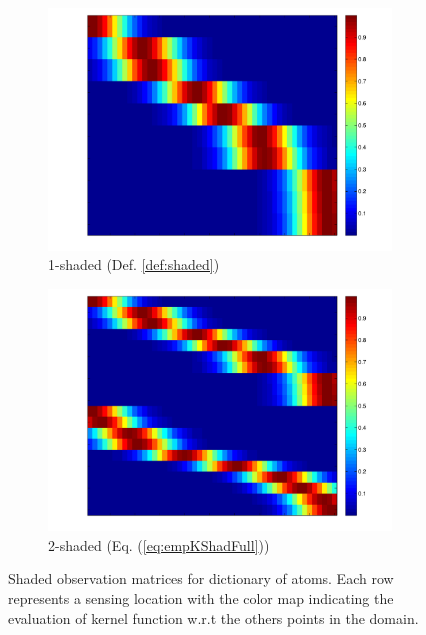 \documentclass[letterpaper,12pt,peerreviewca,draftcls]{IEEEtran}
\renewcommand{\eqref}[1]{(\ref{eq:#1})}
\begin{document}
\begin{figure}
	\centering
	\begin{subfigure}[t]{0.49\textwidth}
		\includegraphics[width=\linewidth]{"Figure 4a.pdf"}
		\caption{1-shaded (Def. \ref{def:shaded})} \label{fig:shadeda}
	\end{subfigure}
	\begin{subfigure}[t]{0.49\textwidth}
		\includegraphics[width=\linewidth]{"Figure 4b.pdf"} 
		\caption{2-shaded (Eq. \eqref{empKShadFull})} \label{fig:shadedb}
	\end{subfigure}
	\caption{Shaded observation matrices for dictionary of atoms. Each row represents a sensing location with the color map indicating the evaluation of kernel function w.r.t the others points in the domain.}
	\label{fig:shaded}
\end{figure}
\end{document}
